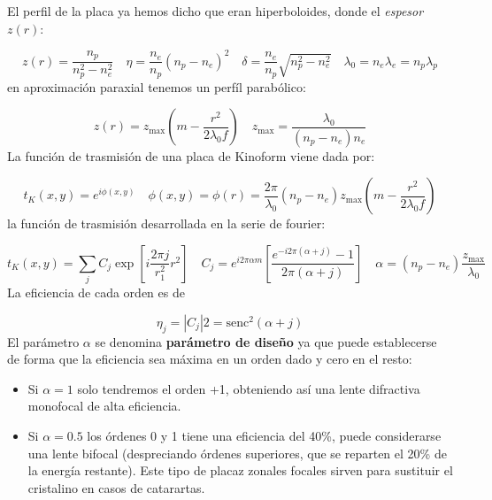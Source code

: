 \documentclass[12pt,a4paper]{book}
\numberwithin{equation}{section}
\numberwithin{figure}{section}
\newcommand{\parentesis}[1]{\left( #1  \right)}
\newcommand{\ccorchetes}[1]{\left[ #1  \right]}
\newcommand{\1}{_{(1)}}
\newcommand{\2}{_{(2)}}
\newcommand{\sinc}{\mathrm{senc} }
\theoremstyle{definition}
\begin{document}
El perfil de la placa ya hemos dicho que eran hiperboloides, donde el \textit{espesor} $z(r)$: 

\begin{equation}
    z(r) = \frac{n_p}{n_p^2-n_e^2} \quad \eta=\frac{n_e}{n_p} (n_p-n_e)^2  \quad \delta = \frac{n_e}{n_p} \sqrt{n_p^2 - n_e^2} \quad \lambda_0 = n_e \lambda_e = n_p \lambda_p 
\end{equation}
en aproximación paraxial tenemos un perfíl parabólico:

\begin{equation}
    z(r) = z_{\max} \parentesis{m - \frac{r^2}{2 \lambda_0 f}} \quad z_{\max} = \frac{\lambda_0}{(n_p-n_e)n_e} 
\end{equation}
La función de trasmisión de una placa de Kinoform viene dada por:

\begin{equation}
    t_{K} (x,y) = e^{i\phi(x,y)} \quad \phi(x,y) = \phi (r) = \frac{2\pi}{\lambda_0} (n_p-n_e) z_{\max} \parentesis{m-\frac{r^2}{2 \lambda_0 f}} 
\end{equation}
la función de trasmisión desarrollada en la serie de fourier:

\begin{equation}
    t_{K} (x,y) = \sum_j C_j \exp \ccorchetes{i \frac{2\pi j}{r_1^2}r^2} \quad C_j = e^{i2\pi \alpha m} \ccorchetes{\frac{e^{-i2\pi (\alpha+j)}-1}{2 \pi (\alpha +j)}}  \quad \alpha = (n_p - n_e) \frac{z_{\max}}{\lambda_0}
\end{equation}
La eficiencia de cada orden es de 

\begin{equation}
    \eta_j = |C_j|2 = \sinc^2(\alpha+j)
\end{equation}
El parámetro $\alpha$ se denomina \textbf{parámetro de diseño} ya que puede establecerse de forma que la eficiencia sea máxima en un orden dado y cero en el resto: 

\begin{itemize}
    \item Si $\alpha=1$ solo tendremos el orden +1, obteniendo así una lente difractiva monofocal de alta eficiencia. \\
    \item Si $\alpha=0.5$ los órdenes 0 y 1 tiene una eficiencia del 40\%, puede considerarse una lente bifocal (despreciando órdenes superiores, que se reparten el 20\% de la energía restante). Este tipo de placaz zonales focales sirven para sustituir el cristalino en casos de catarartas. 
\end{itemize}
\end{document}
